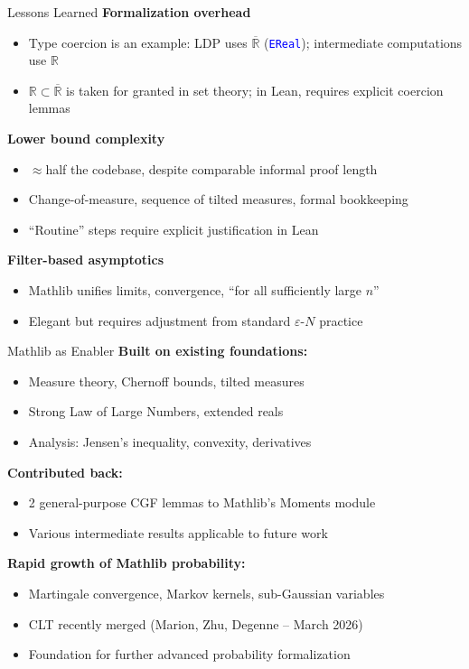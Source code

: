 \documentclass[aspectratio=169]{beamer}
\newcommand{\R}{\mathbb{R}}
\newcommand{\leancode}[1]{\textcolor{blue}{\nolinkurl{#1}}}
\begin{document}
\begin{frame}{Lessons Learned}
  \textbf{Formalization overhead}
  \begin{itemize}
    \item Type coercion is an example: LDP uses $\overline{\R}$ (\leancode{EReal}); intermediate computations use $\R$
    \item $\R \subset \overline{\R}$ is taken for granted in set theory; in Lean, requires explicit coercion lemmas
  \end{itemize}

  \vspace{0.3cm}
  \textbf{Lower bound complexity}
  \begin{itemize}
    \item $\approx$half the codebase, despite comparable informal proof length
    \item Change-of-measure, sequence of tilted measures, formal bookkeeping
    \item ``Routine'' steps require explicit justification in Lean
  \end{itemize}

  \vspace{0.3cm}
  \textbf{Filter-based asymptotics}
  \begin{itemize}
    \item Mathlib unifies limits, convergence, ``for all sufficiently large $n$''
    \item Elegant but requires adjustment from standard $\varepsilon$-$N$ practice
  \end{itemize}
\end{frame}

\begin{frame}{Mathlib as Enabler}
  \textbf{Built on existing foundations:}
  \begin{itemize}
    \item Measure theory, Chernoff bounds, tilted measures
    \item Strong Law of Large Numbers, extended reals
    \item Analysis: Jensen's inequality, convexity, derivatives
  \end{itemize}

  \vspace{0.3cm}
  \textbf{Contributed back:}
  \begin{itemize}
    \item 2 general-purpose CGF lemmas to Mathlib's Moments module
    \item Various intermediate results applicable to future work
  \end{itemize}

  \vspace{0.3cm}
  \textbf{Rapid growth of Mathlib probability:}
  \begin{itemize}
    \item Martingale convergence, Markov kernels, sub-Gaussian variables
    \item CLT recently merged (Marion, Zhu, Degenne -- March 2026)
    \item Foundation for further advanced probability formalization
  \end{itemize}
\end{frame}
\end{document}
